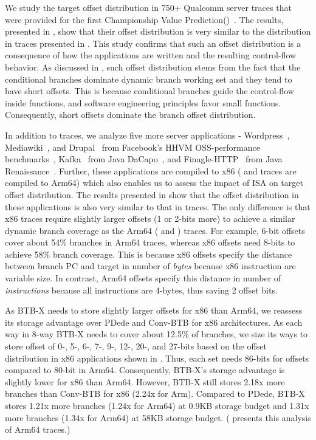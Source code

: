 We study the target offset distribution in 750+ Qualcomm server traces that were provided for the first Championship Value Prediction()~\cite{cvp}. The results, presented in , show that their offset distribution is very similar to the distribution in  traces presented in . This study confirms that such an offset distribution is a consequence of how the applications are written and the resulting control-flow behavior. As discussed in , such offset distribution stems from the fact that the conditional branches dominate dynamic branch working set and they tend to have short offsets. This is because conditional branches guide the control-flow inside functions, and software engineering principles favor small functions. Consequently, short offsets dominate the branch offset distribution.

In addition to  traces, we analyze five more server applications - Wordpress~\cite{wiki:wordpress}, Mediawiki~\cite{wiki:mediawiki}, and Drupal~\cite{wiki:drupal} from Facebook’s HHVM OSS-performance benchmarks~\cite{fboss}, Kafka~\cite{wiki:kafka} from Java DaCapo~\cite{blackburn2006dacapo}, and Finagle-HTTP~\cite{finagle-http} from Java Renaissance~\cite{Prokopec2019}. Further, these applications are compiled to x86 ( and  traces are compiled to Arm64) which also enables us to assess the impact of ISA on target offset distribution. The results presented in  show that the offset distribution in these applications is also very similar to that in  traces. The only difference is that x86 traces require slightly larger offsets (1 or 2-bits more) to achieve a similar dynamic branch coverage as the Arm64 ( and ) traces. For example, 6-bit offsets cover about 54\% branches in Arm64 traces, whereas x86 offsets need 8-bits to achieve 58\% branch coverage. This is because x86 offsets specify the distance between branch PC and target in number of \emph{bytes} because x86 instruction are variable size. In contrast, Arm64 offsets specify this distance in number of \emph{instructions} because all instructions are 4-bytes, thus saving 2 offset bits.

As BTB-X needs to store slightly larger offsets for x86 than Arm64, we reassess its storage advantage over PDede and Conv-BTB for x86 architectures. As each way in 8-way BTB-X needs to cover about 12.5\% of branches, we size its ways to store offset of 0-, 5-, 6-, 7-, 9-, 12-, 20-, and 27-bits based on the offset distribution in x86 applications shown in . Thus, each set needs 86-bits for offsets compared to 80-bit in Arm64. Consequently, BTB-X's storage advantage is slightly lower for x86 than Arm64. However, BTB-X still stores 2.18x more branches than Conv-BTB for x86 (2.24x for Arm). Compared to PDede, BTB-X stores 1.21x more branches (1.24x for Arm64) at 0.9KB storage budget and 1.31x more branches (1.34x for Arm64) at 58KB storage budget. ( presents this analysis of Arm64 traces.)

